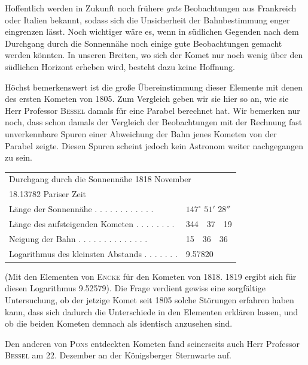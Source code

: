 \par\indent Hoffentlich werden in Zukunft noch frühere \emph{gute} Beobachtungen aus Frankreich oder Italien bekannt, sodass sich die Unsicherheit der Bahnbestimmung enger eingrenzen lässt. Noch wichtiger wäre es, wenn in südlichen Gegenden nach dem Durchgang durch die Sonnennähe noch einige gute Beobachtungen gemacht werden könnten. In unseren Breiten, wo sich der Komet nur noch wenig über den südlichen Horizont erheben wird, besteht dazu keine Hoffnung.

\par\indent Höchst bemerkenswert ist die große Übereinstimmung dieser Elemente mit denen des ersten Kometen von 1805. Zum Vergleich geben wir sie hier so an, wie sie Herr Professor \textsc{Bessel} damals für eine Parabel berechnet hat. Wir bemerken nur noch, dass schon damals der Vergleich der Beobachtungen mit der Rechnung fast unverkennbare Spuren einer Abweichung der Bahn jenes Kometen von der Parabel zeigte. Diesen Spuren scheint jedoch kein Astronom weiter nachgegangen zu sein.

\begin{center}
\begin{tabular}{l l}
\multicolumn{2}{l}{Durchgang durch die Sonnennähe 1818 November} \\
\multicolumn{2}{l}{18.13782 Pariser Zeit} \\
Länge der Sonnennähe . . . . . . . . . . . . & $147^\circ$ $51'$ $28''$ \\
Länge des aufsteigenden Kometen . . . . . . . . & 344\ \ 37\ \ 19 \\
Neigung der Bahn . . . . . . . . . . . . . . & 15\ \ 36\ \ 36 \\
Logarithmus des kleinsten Abstands . . . . . . . & 9.57820 \\
\end{tabular}
\end{center}

\noindent (Mit den Elementen von \textsc{Encke} für den Kometen von 1818. 1819 ergibt sich für diesen Logarithmus 9.52579). Die Frage verdient gewiss eine sorgfältige Untersuchung, ob der jetzige Komet seit 1805 solche Störungen erfahren haben kann, dass sich dadurch die Unterschiede in den Elementen erklären lassen, und ob die beiden Kometen demnach als identisch anzusehen sind.

\par\indent Den anderen von \textsc{Pons} entdeckten Kometen fand seinerseits auch Herr Professor \textsc{Bessel} am 22. Dezember an der Königsberger Sternwarte auf.


